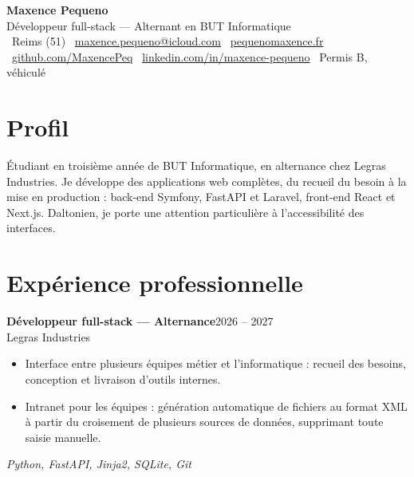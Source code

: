 \documentclass[10pt,a4paper]{article}
\newcommand{\entry}[4]{%
  \textbf{#1}\hfill{\color{muted}#2}\\
  {\color{accent}#3}\hfill{\color{muted}\small #4}\par\vspace{0.2ex}}
\newcommand{\stack}[1]{{\color{muted}\small\textit{#1}}\par}
\begin{document}
\begin{center}
  {\fontsize{24}{28}\selectfont\bfseries\color{accent} Maxence Pequeno}\\[0.8ex]
  {\large Développeur full-stack — Alternant en BUT Informatique}\\[1.2ex]
  \small
  \faMapMarker*\ Reims (51) \quad
  \faEnvelope\ \href{mailto:maxence.pequeno@icloud.com}{maxence.pequeno@icloud.com} \quad
  \faGlobe\ \href{https://pequenomaxence.fr}{pequenomaxence.fr} \\[0.5ex]
  \faGithub\ \href{https://github.com/MaxencePeq}{github.com/MaxencePeq} \quad
  \faLinkedin\ \href{https://www.linkedin.com/in/maxence-pequeno-671581329/}{linkedin.com/in/maxence-pequeno} \quad
  \faCar\ Permis B, véhiculé
\end{center}

\section{Profil}
Étudiant en troisième année de BUT Informatique, en alternance chez Legras Industries.
Je développe des applications web complètes, du recueil du besoin à la mise en production :
back-end Symfony, FastAPI et Laravel, front-end React et Next.js.
Daltonien, je porte une attention particulière à l'accessibilité des interfaces.

\section{Expérience professionnelle}

\entry{Développeur full-stack — Alternance}{2026 -- 2027}{Legras Industries}{}
\begin{itemize}
  \item Interface entre plusieurs équipes métier et l'informatique : recueil des besoins,
        conception et livraison d'outils internes.
  \item Intranet pour les équipes : génération automatique de fichiers
        au format XML à partir du croisement de plusieurs sources de données, supprimant toute saisie manuelle.
\end{itemize}
\stack{Python, FastAPI, Jinja2, SQLite, Git}
\vspace{1ex}
\end{document}
